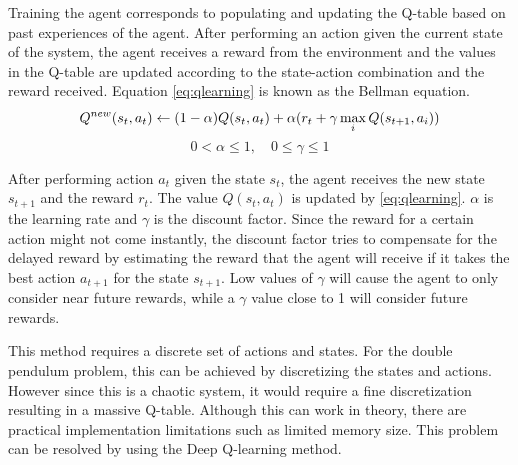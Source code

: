 \documentclass{LTHtwocol} %
\begin{document}
Training the agent corresponds to populating and updating the Q-table based on past experiences of the agent.
After performing an action given the current state of the system, the agent receives a reward from the environment and the values in the Q-table are updated according to the state-action combination and the reward received.
Equation \eqref{eq:qlearning} is known as the Bellman equation.
\begin{equation}
Q^{new}(s_t,a_t) \leftarrow (1 - \alpha)Q(s_t,a_t) + \alpha (r_t + \gamma \max_i Q(s_{t+1},a_i )) \\
\label{eq:qlearning} 
\end{equation}
\[ 0 < \alpha \leq 1, \quad 0 \leq \gamma \leq 1  \]

After performing action $a_t$ given the state $s_t$, the agent receives the new state $s_{t+1}$ and the reward $r_t$. The value $Q(s_t,a_t)$ is updated by \eqref{eq:qlearning}. $\alpha$ is the learning rate and $\gamma$ is the discount factor. Since the reward for a certain action might not come instantly, the discount factor tries to compensate for the delayed reward by estimating the reward that the agent will receive if it takes the best action $a_{t+1}$ for the state $s_{t+1}$. Low values of $\gamma$ will cause the agent to only consider near future rewards, while a $\gamma$ value close to 1 will consider future rewards.


This method requires a discrete set of actions and states. For the double pendulum problem, this can be achieved by discretizing the states and actions.
However since this is a chaotic system, it would require a fine discretization resulting in a massive Q-table. Although this can work in theory, there are practical implementation limitations such as limited memory size.
This problem can be resolved by using the Deep Q-learning method.
\end{document}
